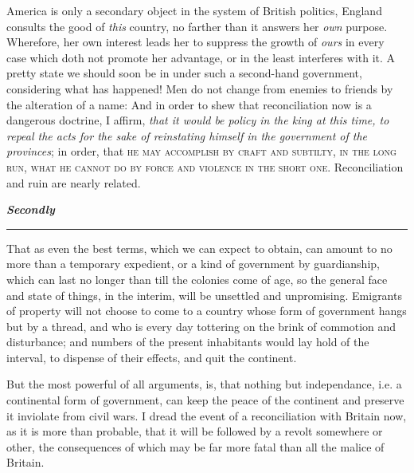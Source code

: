 \documentclass[12pt, twocolumn]{book}
\begin{document}
    America is only a secondary object in the system of British politics, England consults the good of \textit{this} country, no farther than it answers her \textit{own} purpose. Wherefore, her own interest leads her to suppress the growth of \textit{ours} in every case which doth not promote her advantage, or in the least interferes with it. A pretty state we should soon be in under such a second-hand government, considering what has happened! Men do not change from enemies to friends by the alteration of a name: And in order to shew that reconciliation now is a dangerous doctrine, I affirm, \textit{that it would be policy in the king at this time, to repeal the acts for the sake of reinstating himself in the government of the provinces}; in order, that \textsc{he may accomplish by craft and subtilty, in the long run, what he cannot do by force and violence in the short one}. Reconciliation and ruin are nearly related.

    \bigskip

    {\begin{adjustwidth}{0.5em}{0.5em} \small

        \textit{\textbf{Secondly}}
        \noindent \rule{40pt}{0.5pt}
        
        That as even the best terms, which we can expect to obtain, can amount to no more than a temporary expedient, or a kind of government by guardianship, which can last no longer than till the colonies come of age, so the general face and state of things, in the interim, will be unsettled and unpromising. Emigrants of property will not choose to come to a country whose form of government hangs but by a thread, and who is every day tottering on the brink of commotion and disturbance; and numbers of the present inhabitants would lay hold of the interval, to dispense of their effects, and quit the continent.

    \end{adjustwidth}}

    \bigskip

    But the most powerful of all arguments, is, that nothing but independance, i.e. a continental form of government, can keep the peace of the continent and preserve it inviolate from civil wars. I dread the event of a reconciliation with Britain now, as it is more than probable, that it will be followed by a revolt somewhere or other, the consequences of which may be far more fatal than all the malice of Britain.
\end{document}
